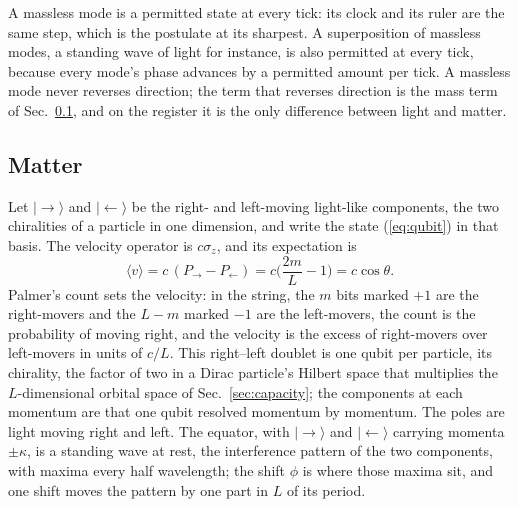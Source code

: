 \documentclass[aps,prd,twocolumn,superscriptaddress,nofootinbib]{revtex4-2}
\begin{document}
A massless mode is a permitted state at every tick: its clock and its ruler are the same step, which is the postulate at its sharpest. A superposition of massless modes, a standing wave of light for instance, is also permitted at every tick, because every mode's phase advances by a permitted amount per tick. A massless mode never reverses direction; the term that reverses direction is the mass term of Sec.~\ref{sec:matter}, and on the register it is the only difference between light and matter.

\subsection{Matter}
\label{sec:matter}

Let $|{\rightarrow}\rangle$ and $|{\leftarrow}\rangle$ be the right- and left-moving light-like components, the two chiralities of a particle in one dimension, and write the state (\ref{eq:qubit}) in that basis. The velocity operator is $c\sigma_z$, and its expectation is
\begin{equation}
\langle v\rangle = c\,(P_\rightarrow - P_\leftarrow) = c\Big(\frac{2m}{L} - 1\Big) = c\cos\theta .
\label{eq:velocity}
\end{equation}
Palmer's count sets the velocity: in the string, the $m$ bits marked $+1$ are the right-movers and the $L-m$ marked $-1$ are the left-movers, the count is the probability of moving right, and the velocity is the excess of right-movers over left-movers in units of $c/L$. This right--left doublet is one qubit per particle, its chirality, the factor of two in a Dirac particle's Hilbert space that multiplies the $L$-dimensional orbital space of Sec.~\ref{sec:capacity}; the components at each momentum are that one qubit resolved momentum by momentum. The poles are light moving right and left. The equator, with $|{\rightarrow}\rangle$ and $|{\leftarrow}\rangle$ carrying momenta $\pm\kappa$, is a standing wave at rest, the interference pattern of the two components, with maxima every half wavelength; the shift $\phi$ is where those maxima sit, and one shift moves the pattern by one part in $L$ of its period.
\end{document}
